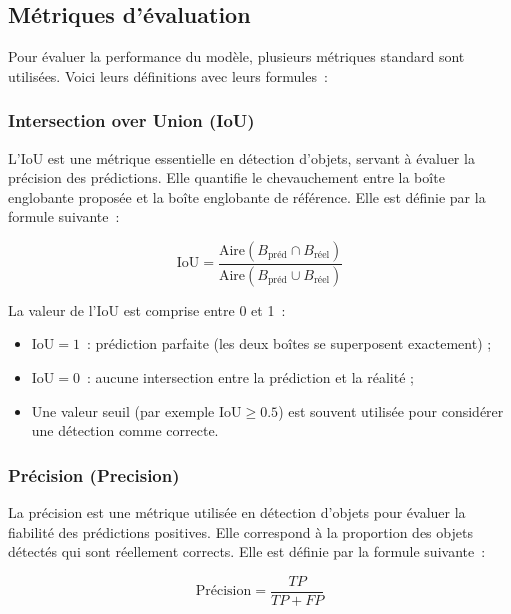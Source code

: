 \subsection{Métriques d'évaluation}

Pour évaluer la performance du modèle, plusieurs métriques standard sont utilisées.
Voici leurs définitions avec leurs formules~:

\subsubsection*{Intersection over Union (IoU)}

L'IoU est une métrique essentielle en détection d'objets, servant à évaluer la
précision des prédictions. Elle quantifie le chevauchement entre la boîte englobante
proposée et la boîte englobante de référence.
Elle est définie par la formule suivante~:

\begin{equation}
\text{IoU} = \frac{\text{Aire}(B_{\text{préd}} \cap B_{\text{réel}})}
                  {\text{Aire}(B_{\text{préd}} \cup B_{\text{réel}})}
\label{eq:iou}
\end{equation}

La valeur de l'IoU est comprise entre 0 et 1~:
\begin{itemize}
  \item $\text{IoU} = 1$~: prédiction parfaite (les deux boîtes se superposent exactement) ;
  \item $\text{IoU} = 0$~: aucune intersection entre la prédiction et la réalité ;
  \item Une valeur seuil (par exemple $\text{IoU} \geq 0.5$) est souvent utilisée
        pour considérer une détection comme correcte.
\end{itemize}

\subsubsection*{Précision (Precision)}

La précision est une métrique utilisée en détection d'objets pour évaluer la
fiabilité des prédictions positives. Elle correspond à la proportion des objets
détectés qui sont réellement corrects.
Elle est définie par la formule suivante~:

\begin{equation}
\text{Précision} = \frac{TP}{TP + FP}
\label{eq:precision}
\end{equation}

